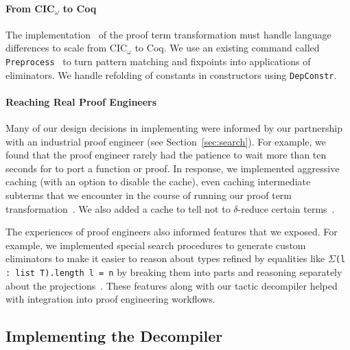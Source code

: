 \paragraph{From CIC$_{\omega}$ to Coq}
The implementation~ %
of the proof term transformation must handle language differences to scale from CIC$_{\omega}$ to Coq.
We use an existing command called \lstinline{Preprocess}~\cite{Ringer2019} to turn pattern matching and fixpoints into 
applications of eliminators.
We handle refolding of constants in constructors using \lstinline{DepConstr}.

\paragraph{Reaching Real Proof Engineers}
Many of our design decisions in implementing \toolname were informed by our partnership with
an industrial proof engineer (see Section~\ref{sec:search}).
For example, we found that the proof engineer rarely had the patience to wait more than ten seconds
for \toolname to port a function or proof.
In response, we implemented aggressive caching (with an option to disable the cache), even caching intermediate subterms that
we encounter in the course of running our proof term transformation~.
We also added a cache to tell \toolname not to $\delta$-reduce certain terms~. %

The experiences of proof engineers also informed features that we exposed.
For example, we implemented special search procedures to generate custom eliminators %
to make it easier to reason about types refined by equalities like $\Sigma$\lstinline{(l : list T).length l = n}
by breaking them into parts and reasoning separately about the projections~. %
These features along with our tactic decompiler helped with integration into proof engineering workflows.

\subsection{Implementing the Decompiler}
\label{sec:second}

